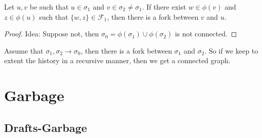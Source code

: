 \begin{definition}[Fork]
Let $u, v$ be such that $u \in \sigma_{1}$ and $v \in \sigma_{2} \neq \sigma_{1}$. If there exist $w \in \phi(v)$ and $z \in \phi(u)$ such that $\{w, z\} \in \mathcal{F}_{1}$, then there is a fork between $v$ and $u$.
\end{definition}
\begin{proof}
  Idea: Suppose not, then $\sigma_{0} = \phi(\sigma_{1}) \cup \phi(\sigma_{2}) $ is not connected.  
\end{proof}
\begin{claim}
Assume that $\sigma_{1}, \sigma_{2} \rightarrow \sigma_{0}$, then there is a fork between $\sigma_{1}$ and $\sigma_{2}$. So if we keep to extent the history in a recursive manner, then we get a connected graph.
\end{claim}

\section{Garbage} 


\subsection{Drafts-Garbage}

